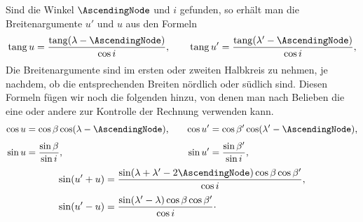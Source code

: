 Sind die Winkel $\AscendingNode$ und $i$ gefunden, so erhält man die Breitenargumente $u'$ und $u$ aus den Formeln
\[
\operatorname{tang}u=\frac{\operatorname{tang}(\lambda-\AscendingNode)}{\cos i},\qquad
\operatorname{tang}u'=\frac{\operatorname{tang}(\lambda'-\AscendingNode)}{\cos i},
\]
Die Breitenargumente sind im ersten oder zweiten Halbkreis zu nehmen, je nachdem, ob die entsprechenden Breiten nördlich oder südlich sind. Diesen Formeln fügen wir noch die folgenden hinzu, von denen man nach Belieben die eine oder andere zur Kontrolle der Rechnung verwenden kann.
\[
\begin{aligned}
\cos u&=\cos\beta\cos(\lambda-\AscendingNode),&\quad \cos u'&=\cos\beta'\cos(\lambda'-\AscendingNode),\\[3pt]
\sin u&=\frac{\sin\beta}{\sin i},&\sin u'&=\frac{\sin\beta'}{\sin i},
\end{aligned}
\]
\[
\begin{aligned}
\sin(u'+u)&=\frac{\sin(\lambda+\lambda'-2\AscendingNode)\cos\beta\cos\beta'}{\cos i},\\[3pt]
\sin(u'-u)&=\frac{\sin(\lambda'-\lambda)\cos\beta\cos\beta'}{\cos i}\mathpunct{\cdot}
\end{aligned}
\]
